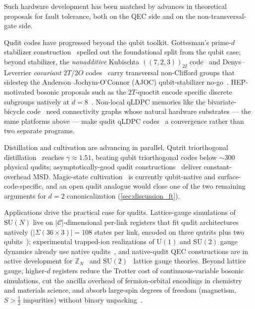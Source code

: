 \documentclass[twocolumn,superscriptaddress,showpacs,nofootinbib,notitlepage,preprintnumbers,secnumarabic,amssymb, nobibnotes, aps, prd]{revtex4-2}
\begin{document}
Such hardware development has been matched by advances in theoretical proposals for fault tolerance, both on the QEC side and on the non-transversal-gate side.

Qudit codes have progressed beyond the qubit toolkit. Gottesman's prime-$d$ stabilizer construction~\cite{Gottesman:1998} spelled out the foundational split from the qubit case; beyond stabilizer, the \emph{nonadditive} Kubischta $((7,2,3))_{2I}$ code~\cite{Kubischta:2I} and Denys--Leverrier \emph{covariant} $2T$/$2O$ codes~\cite{DenysLeverrier:2023,DenysLeverrier:2024} carry transversal non-Clifford groups that sidestep the Anderson--Jochym-O'Connor (AJOC) qubit-stabilizer no-go~\cite{Anderson:2014}. HEP-motivated bosonic proposals such as the $2T$-quoctit encode specific discrete subgroups natively at $d=8$~\cite{Kurkcuoglu:2025quoctit}. Non-local qLDPC memories like the bivariate-bicycle code~\cite{Bravyi:2024bb} need connectivity graphs whose natural hardware substrates --- the same platforms above --- make qudit qLDPC codes~\cite{Spencer:2025qldpc,Vasic:2025qldpc} a convergence rather than two separate programs.

Distillation and cultivation are advancing in parallel. Qutrit triorthogonal distillation~\cite{Campbell:2012jna,PrakashSaha:2025} reaches $\gamma\approx 1.51$, beating qubit triorthogonal codes below $\sim\!300$ physical qudits; asymptotically-good qudit constructions~\cite{WillsHsiehYamasaki:2025,Cervia:2025agc} deliver constant-overhead MSD. Magic-state cultivation~\cite{Gidney:2024cultivation,Vaknin:2025cultivation,Rosenfeld:2025cultivation} is currently qubit-native and surface-code-specific, and an open qudit analogue would close one of the two remaining arguments for $d=2$ canonicalization (\cref{sec:discussion_ft}).

Applications drive the practical case for qudits. Lattice-gauge simulations of $\mathrm{SU}(N)$ live on $|\mathcal{C}|$-dimensional per-link registers that fit qudit architectures natively ($|\Sigma(36\!\times\!3)|=108$ states per link, encoded on three qutrits plus two qubits~\cite{Lamm:2019bik,GustafsonJi:2024sig}); experimental trapped-ion realizations of $\mathrm{U}(1)$ and $\mathrm{SU}(2)$ gauge dynamics already use native qudits~\cite{Meth:2023wzd,Popov:2023tkp}, and native-qudit QEC constructions are in active development for $\mathbb{Z}_N$~\cite{Spagnoli:2026qsc} and $\mathrm{SU}(2)$~\cite{Bradshaw:2026aec} lattice gauge theories. Beyond lattice gauge, higher-$d$ registers reduce the Trotter cost of continuous-variable bosonic simulations, cut the ancilla overhead of fermion-orbital encodings in chemistry and materials science, and absorb large-spin degrees of freedom (magnetism, $S>\tfrac{1}{2}$ impurities) without binary unpacking~\cite{Wang:2020qudits,Kiktenko:2024colloquium}.
\end{document}
